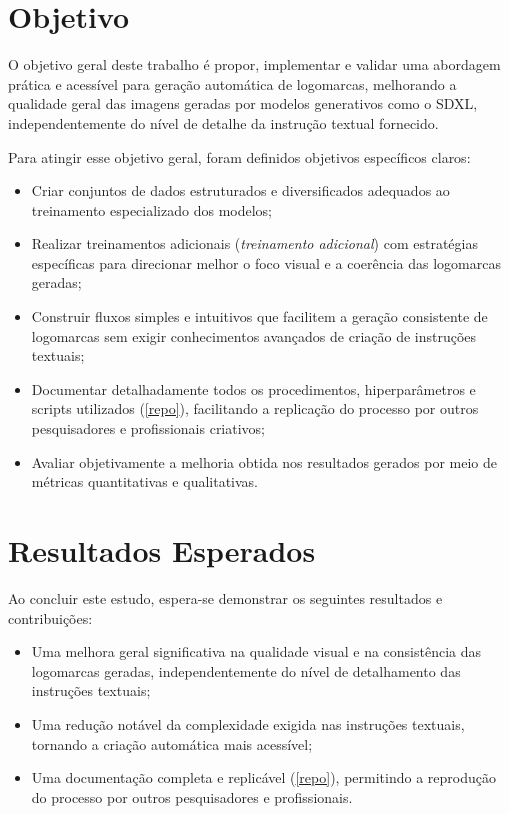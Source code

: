 \documentclass[12pt, %
openright, 
oneside, %
a4paper,    %
brazil]{facom-ufu-abntex2}
\begin{document}
\section{Objetivo}

O objetivo geral deste trabalho é propor, implementar e validar uma abordagem prática e acessível para geração automática de logomarcas, melhorando a qualidade geral das imagens geradas por modelos generativos como o SDXL, independentemente do nível de detalhe da instrução textual fornecido.

Para atingir esse objetivo geral, foram definidos objetivos específicos claros:

\begin{itemize}
    \item Criar conjuntos de dados estruturados e diversificados adequados ao treinamento especializado dos modelos;
    \item Realizar treinamentos adicionais (\textit{treinamento adicional}) com estratégias específicas para direcionar melhor o foco visual e a coerência das logomarcas geradas;
    \item Construir fluxos simples e intuitivos que facilitem a geração consistente de logomarcas sem exigir conhecimentos avançados de criação de instruções textuais;
    \item Documentar detalhadamente todos os procedimentos, hiperparâmetros e scripts utilizados (\ref{repo}), facilitando a replicação do processo por outros pesquisadores e profissionais criativos;
    \item Avaliar objetivamente a melhoria obtida nos resultados gerados por meio de métricas quantitativas e qualitativas.
\end{itemize}

\section{Resultados Esperados}

Ao concluir este estudo, espera-se demonstrar os seguintes resultados e contribuições:

\begin{itemize}
    \item Uma melhora geral significativa na qualidade visual e na consistência das logomarcas geradas, independentemente do nível de detalhamento das instruções textuais;
    \item Uma redução notável da complexidade exigida nas instruções textuais, tornando a criação automática mais acessível;
    \item Uma documentação completa e replicável (\ref{repo}), permitindo a reprodução do processo por outros pesquisadores e profissionais.
\end{itemize}
\end{document}
